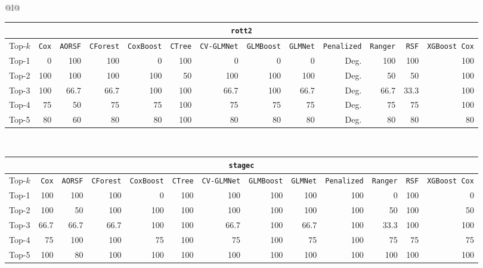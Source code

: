 \begin{longtable}{@{}l@{}}
\begin{tabular}{@{}l*{12}{r}@{}}
\multicolumn{13}{c}{\texttt{rott2}} \\
\midrule
Top-$k$ & \texttt{Cox} & \texttt{AORSF} & \texttt{CForest} & \texttt{CoxBoost} & \texttt{CTree} & \texttt{CV-GLMNet} & \texttt{GLMBoost} & \texttt{GLMNet} & \texttt{Penalized} & \texttt{Ranger} & \texttt{RSF} & \texttt{XGBoost Cox} \\
\midrule
Top-1 & 0 & 100 & 100 & 0 & 100 & 0 & 0 & 0 & Deg. & 100 & 100 & 100 \\
Top-2 & 100 & 100 & 100 & 100 & 50 & 100 & 100 & 100 & Deg. & 50 & 50 & 100 \\
Top-3 & 100 & 66.7 & 66.7 & 100 & 100 & 66.7 & 100 & 66.7 & Deg. & 66.7 & 33.3 & 100 \\
Top-4 & 75 & 50 & 75 & 75 & 100 & 75 & 75 & 75 & Deg. & 75 & 75 & 100 \\
Top-5 & 80 & 60 & 80 & 80 & 100 & 80 & 80 & 80 & Deg. & 80 & 80 & 80 \\
\end{tabular} \\
\midrule

\begin{tabular}{@{}l*{12}{r}@{}}
\multicolumn{13}{c}{\texttt{stagec}} \\
\midrule
Top-$k$ & \texttt{Cox} & \texttt{AORSF} & \texttt{CForest} & \texttt{CoxBoost} & \texttt{CTree} & \texttt{CV-GLMNet} & \texttt{GLMBoost} & \texttt{GLMNet} & \texttt{Penalized} & \texttt{Ranger} & \texttt{RSF} & \texttt{XGBoost Cox} \\
\midrule
Top-1 & 100 & 100 & 100 & 0 & 100 & 100 & 100 & 100 & 100 & 0 & 100 & 0 \\
Top-2 & 100 & 50 & 100 & 100 & 100 & 100 & 100 & 100 & 100 & 50 & 100 & 50 \\
Top-3 & 66.7 & 66.7 & 66.7 & 100 & 100 & 66.7 & 100 & 66.7 & 100 & 33.3 & 100 & 100 \\
Top-4 & 75 & 100 & 100 & 75 & 100 & 75 & 100 & 75 & 100 & 75 & 75 & 75 \\
Top-5 & 100 & 80 & 100 & 100 & 100 & 100 & 100 & 100 & 100 & 100 & 100 & 100 \\
\end{tabular} \\
\midrule


\end{longtable}
